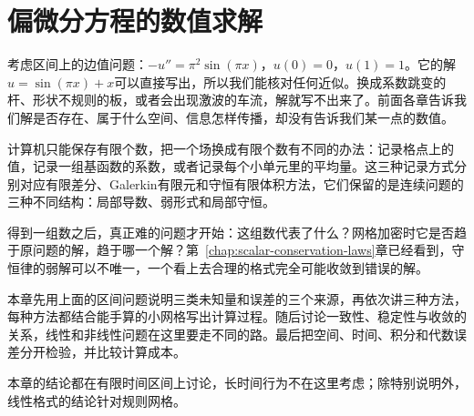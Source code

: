 \chapter{偏微分方程的数值求解}
\label{chap:pde-numerical-methods}

考虑区间上的边值问题：$-u''=\pi^2\sin(\pi x)$，$u(0)=0$，$u(1)=1$。它的解$u=\sin(\pi x)+x$可以直接写出，所以我们能核对任何近似。换成系数跳变的杆、形状不规则的板，或者会出现激波的车流，解就写不出来了。前面各章告诉我们解是否存在、属于什么空间、信息怎样传播，却没有告诉我们某一点的数值。

计算机只能保存有限个数，把一个场换成有限个数有不同的办法：记录格点上的值，记录一组基函数的系数，或者记录每个小单元里的平均量。这三种记录方式分别对应有限差分、Galerkin有限元和守恒有限体积方法，它们保留的是连续问题的三种不同结构：局部导数、弱形式和局部守恒。

得到一组数之后，真正难的问题才开始：这组数代表了什么？网格加密时它是否趋于原问题的解，趋于哪一个解？第~\ref{chap:scalar-conservation-laws}章已经看到，守恒律的弱解可以不唯一，一个看上去合理的格式完全可能收敛到错误的解。

本章先用上面的区间问题说明三类未知量和误差的三个来源，再依次讲三种方法，每种方法都结合能手算的小网格写出计算过程。随后讨论一致性、稳定性与收敛的关系，线性和非线性问题在这里要走不同的路。最后把空间、时间、积分和代数误差分开检验，并比较计算成本。

本章的结论都在有限时间区间上讨论，长时间行为不在这里考虑；除特别说明外，线性格式的结论针对规则网格。









